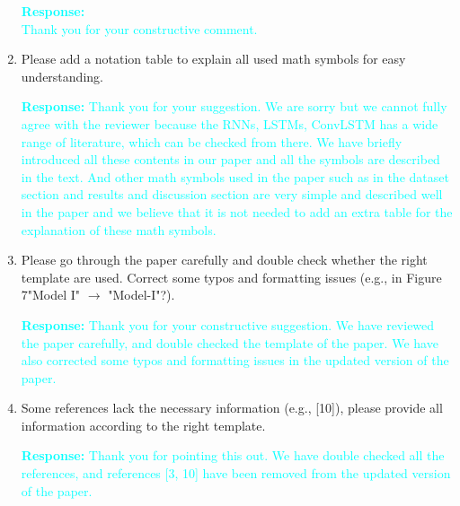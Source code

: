 \documentclass[11pt,a2paper]{report}
\begin{document}
\begin{enumerate}
		\textcolor{Cyan}{
			\textbf{Response:\\}
			Thank you for your constructive comment. \\
		}
	
			\item Please add a notation table to explain all used math symbols 
			for easy understanding.
	
	\textcolor{Cyan}{
		\textbf{Response:}
	Thank you for your suggestion.
	We are sorry but we cannot fully agree with the reviewer because the RNNs, 
	LSTMs, ConvLSTM has a wide range of literature, which can be checked from 
	there. 
	We have briefly introduced all these contents in our paper and all 
	the symbols are described in the text.
    And other math symbols used in the paper such as in the dataset section and 
    results and discussion section are very simple and described well in the 
    paper and we believe that it is not needed to add an extra table for the 
    explanation of these math symbols.}	

			\item Please go through the paper carefully and double check 
			whether the right template are used. Correct some typos and 
			formatting issues (e.g., in Figure 7"Model I" $\to$ "Model-I"?).

    \textcolor{Cyan}{
	\textbf{Response:}
	Thank you for your constructive suggestion.
	We have reviewed the paper carefully, and double checked the template of 
	the paper.
	We have also corrected some typos and formatting issues in the updated 
	version of the paper.
}

			\item Some references lack the necessary information (e.g., [10]), 
			please provide all information according to the right template.

\textcolor{Cyan}{
	\textbf{Response:}
	Thank you for pointing this out.
	We have double checked all the references, and references [3, 10] have been 
	removed from the updated version of the paper.
}


\end{enumerate}
\end{document}
